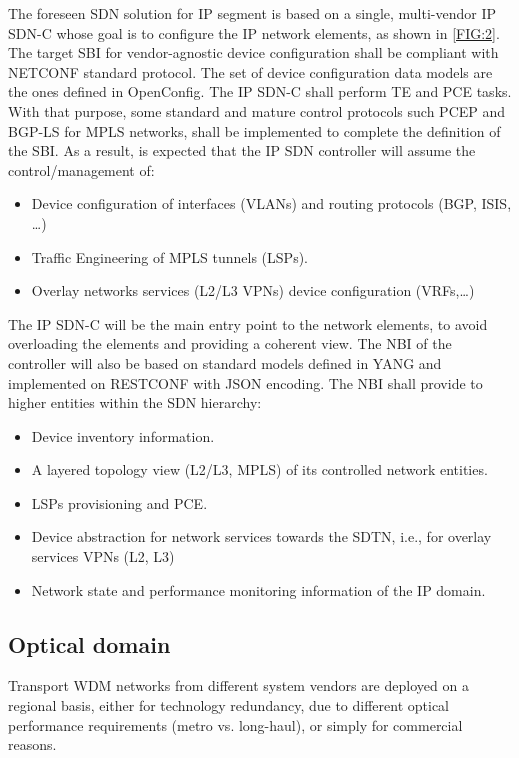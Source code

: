 \documentclass[a4paper,fleqn]{cas-dc}
\begin{document}
The foreseen SDN solution for IP segment is based on a single, multi-vendor IP SDN-C whose goal is to configure the IP network elements, as shown in \cref{FIG:2}. The target SBI for vendor-agnostic device configuration shall be compliant with NETCONF standard protocol. The  set of device configuration data models are the ones defined in OpenConfig. 
The IP SDN-C shall perform TE and PCE tasks. With that purpose, some standard and mature control protocols such PCEP and BGP-LS for MPLS networks, shall be implemented to complete the definition of the SBI. As a result,  is expected that the IP SDN controller will assume the control/management of:
\begin{itemize}
\item Device configuration of interfaces (VLANs) and routing protocols (BGP, ISIS, …)
\item Traffic Engineering of MPLS tunnels (LSPs). 
\item Overlay networks services (L2/L3 VPNs) device configuration (VRFs,\dots)
\end{itemize}

The IP SDN-C will be the main entry point to the network elements, to avoid overloading the elements and providing a coherent view. The NBI of the controller will also be based on standard models defined in YANG and implemented on RESTCONF with JSON encoding. The NBI shall provide to higher entities within the SDN hierarchy:
\begin{itemize}
\item Device inventory information.
\item A layered topology view (L2/L3, MPLS) of its controlled network entities.
\item LSPs provisioning and PCE.
\item Device abstraction for network services towards the SDTN, i.e., for overlay services VPNs (L2, L3)
\item Network state and performance monitoring information of the IP domain. 
\end{itemize}

\subsection{Optical domain}
\label{section:dwdm}
Transport WDM networks from different system vendors are deployed on a regional basis, either for technology redundancy, due to different optical performance requirements (metro vs. long-haul), or simply for commercial reasons. 
\end{document}
